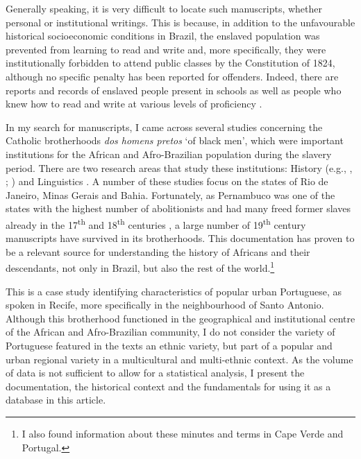 \documentclass[output=paper,colorlinks,citecolor=brown]{langscibook}
\begin{document}
Generally speaking, it is very difficult to locate such manuscripts, whether personal or institutional writings. This is because, in addition to the unfavourable historical socioeconomic conditions in Brazil, the enslaved population was prevented from learning to read and write and, more specifically, they were institutionally forbidden to attend public classes by the Constitution of 1824, although no specific penalty has been reported for offenders. Indeed, there are reports and records of enslaved people present in schools as well as people who knew how to read and write at various levels of proficiency \citep{daSilva_2007}.

In my search for manuscripts, I came across several studies concerning the Catholic brotherhoods \emph{dos homens pretos} ‘of black men’, which were important institutions for the African and Afro-Brazilian population during the slavery period. There are two research areas that study these institutions: History (e.g., \cite{Assis_1998,Levi_2006}, \cite{MacCord_2005}; \cite{Quintao_2002}) and Linguistics \citep[cf.][]{Oliveira_2006,Galves_Lobo_2019}. A number of these studies focus on the states of Rio de Janeiro, Minas Gerais and Bahia. Fortunately, as Pernambuco was one of the states with the highest number of abolitionists and had many freed former slaves already in the 17\textsuperscript{th} and 18\textsuperscript{th} centuries \citep{Klein1969}, a large number of 19\textsuperscript{th} century manuscripts have survived in its brotherhoods. This documentation has proven to be a relevant source for understanding the history of Africans and their descendants, not only in Brazil, but also the rest of the world.\footnote{I also found information about these minutes and terms in Cape Verde and Portugal.}

This is a case study identifying characteristics of popular urban Portuguese, as spoken in Recife, more specifically in the neighbourhood of Santo Antonio. Although this brotherhood functioned in the geographical and institutional centre of the African and Afro-Brazilian community, I do not consider the variety of Portuguese featured in the texts an ethnic variety, but part of a popular and urban regional variety in a multicultural and multi-ethnic context. As the volume of data is not sufficient to allow for a statistical analysis, I present the documentation, the historical context and the fundamentals for using it as a database in this article.
\end{document}

